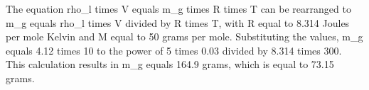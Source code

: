 The equation rho_l times V equals m_g times R times T can be rearranged to m_g equals rho_l times V divided by R times T, with R equal to 8.314 Joules per mole Kelvin and M equal to 50 grams per mole. Substituting the values, m_g equals 4.12 times 10 to the power of 5 times 0.03 divided by 8.314 times 300. This calculation results in m_g equals 164.9 grams, which is equal to 73.15 grams.